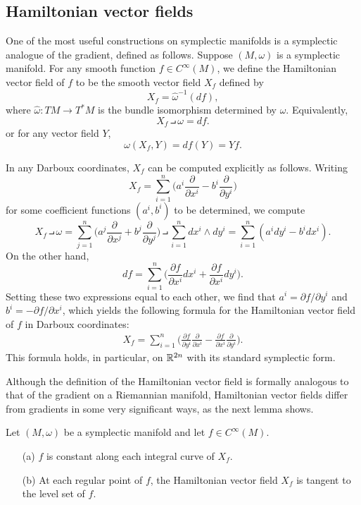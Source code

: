 \subsection{Hamiltonian vector fields}
One of the most useful constructions on symplectic manifolds is a symplectic analogue of the gradient, defined as follows. Suppose $(M,\omega)$ is a symplectic manifold. For any smooth function $f\in C^\infty(M)$, we define the Hamiltonian vector field of $f$ to be the smooth vector field $X_f$ defined by
\[X_f=\widehat{\omega}^{-1}(df),\]
where $\widehat{\omega}:TM\to T^*M$ is the bundle isomorphism determined by $\omega$. Equivalently,
\[X_f\intprod \omega=df.\]
or for any vector field $Y$,
\[\omega(X_f,Y)=df(Y)=Yf.\]

In any Darboux coordinates, $X_f$ can be computed explicitly as follows. Writing
\[X_f=\sum_{i=1}^{n}\Big(a^i\frac{\partial}{\partial x^i}-b^i\frac{\partial}{\partial y^i}\Big)\]
for some coefficient functions $(a^i,b^i)$ to be determined, we compute
\[X_f\intprod\omega=\sum_{j=1}^{n}\Big(a^j\frac{\partial}{\partial x^j}+b^j\frac{\partial}{\partial y^j}\Big)\intprod\sum_{i=1}^{n}dx^i\wedge dy^i=\sum_{i=1}^{n}(a^idy^i-b^idx^i).\]
On the other hand,
\[df=\sum_{i=1}^{n}\Big(\frac{\partial f}{\partial x^i}dx^i+\frac{\partial f}{\partial x^i}dy^i\Big).\]
Setting these two expressions equal to each other, we find that $a^i=\partial f/\partial y^i$ and $b^i=-\partial f/\partial x^i$, which yields the following formula for the Hamiltonian vector field of $f$ in Darboux coordinates:
\begin{align}\label{Hamiltonian vector field}
X_f=\sum_{i=1}^{n}\Big(\frac{\partial f}{\partial y^i}\frac{\partial}{\partial x^i}-\frac{\partial f}{\partial x^i}\frac{\partial}{\partial y^i}\Big).
\end{align}
This formula holds, in particular, on $\mathbb{R}^{2n}$ with its standard symplectic form.\par
Although the definition of the Hamiltonian vector field is formally analogous to that of the gradient on a Riemannian manifold, Hamiltonian vector fields differ from gradients in some very significant ways, as the next lemma shows.
\begin{proposition}\label{Hamiltonian vector field prop}
Let $(M,\omega)$ be a symplectic manifold and let $f\in C^\infty(M)$.
\begin{itemize}
\item[(a)] $f$ is constant along each integral curve of $X_f$.
\item[(b)] At each regular point of $f$, the Hamiltonian vector field $X_f$ is tangent to the level set of $f$.
\end{itemize}
\end{proposition}
